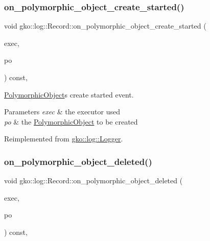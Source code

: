 \subsubsection{\texorpdfstring{on\+\_\+polymorphic\+\_\+object\+\_\+create\+\_\+started()}{on\_polymorphic\_object\_create\_started()}}
{\footnotesize\ttfamily void gko\+::log\+::\+Record\+::on\+\_\+polymorphic\+\_\+object\+\_\+create\+\_\+started (\begin{DoxyParamCaption}\item[{const \hyperlink{classgko_1_1Executor}{Executor} $\ast$}]{exec,  }\item[{const \hyperlink{classgko_1_1PolymorphicObject}{Polymorphic\+Object} $\ast$}]{po }\end{DoxyParamCaption}) const\hspace{0.3cm}{\ttfamily [override]}, {\ttfamily [virtual]}}



\hyperlink{classgko_1_1PolymorphicObject}{Polymorphic\+Object}\textquotesingle{}s create started event. 


\begin{DoxyParams}{Parameters}
{\em exec} & the executor used \\
\hline
{\em po} & the \hyperlink{classgko_1_1PolymorphicObject}{Polymorphic\+Object} to be created \\
\hline
\end{DoxyParams}


Reimplemented from \hyperlink{classgko_1_1log_1_1Logger}{gko\+::log\+::\+Logger}.

\mbox{\label{classgko_1_1log_1_1Record_a04ad5d1551374ee6c9efdc2adc6a8a01}} 
\subsubsection{\texorpdfstring{on\+\_\+polymorphic\+\_\+object\+\_\+deleted()}{on\_polymorphic\_object\_deleted()}}
{\footnotesize\ttfamily void gko\+::log\+::\+Record\+::on\+\_\+polymorphic\+\_\+object\+\_\+deleted (\begin{DoxyParamCaption}\item[{const \hyperlink{classgko_1_1Executor}{Executor} $\ast$}]{exec,  }\item[{const \hyperlink{classgko_1_1PolymorphicObject}{Polymorphic\+Object} $\ast$}]{po }\end{DoxyParamCaption}) const\hspace{0.3cm}{\ttfamily [override]}, {\ttfamily [virtual]}}



